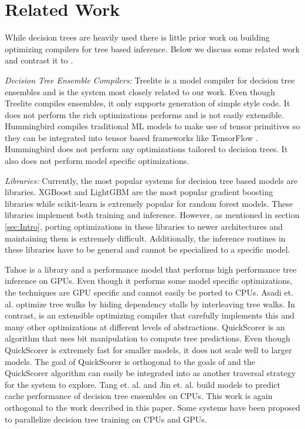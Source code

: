 \section{Related Work}
While decision trees are heavily used there is little prior work on building optimizing compilers for tree 
based inference. Below we discuss some related work and contrast it to \Treebeard{}.

\emph{Decision Tree Ensemble Compilers:}
Treelite\cite{Treelite} is a model compiler for decision tree ensembles and is the system
most closely related to our work. Even though Treelite compiles ensembles, it only supports 
generation of simple  style code. It does not perform the rich 
optimizations \Treebeard{} performs and is not easily extensible.
Hummingbird\cite{Hummingbird} compiles traditional ML models to make use 
of tensor primitives so 
they can be integrated into tensor based frameworks like TensorFlow \cite{TensorFlow}.
Hummingbird does not perform any optimizations tailored to decision trees. It 
also does not perform model specific optimizations. 

\emph{Libraries:} Currently, the most popular systems for decision tree based models 
are libraries. XGBoost\cite{XGBoost} and LightGBM\cite{LightGBM} are the most  
popular gradient boosting libraries while scikit-learn\cite{Sklearn} is 
extremely popular for random forest models. These libraries implement both 
training and inference. However, as mentioned in section \ref{sec:Intro}, porting 
optimizations in these libraries to newer architectures and maintaining them is 
extremely difficult. Additionally, the inference routines in these libraries have 
to be general and cannot be specialized to a specific model.

Tahoe\cite{Tahoe} is a library and a performance model that performs high 
performance tree inference on GPUs. Even though it performs some model 
specific optimizations, the techniques are GPU specific and cannot easily 
be ported to CPUs. Asadi et. al.\cite{VPred} optimize tree walks
by hiding dependency stalls by interleaving tree walks. In contrast, \Treebeard{} is an extensible 
optimizing compiler that carefully implements this and many other optimizations at different levels of abstractions.
QuickScorer\cite{QuickScorer, QuickScorer1} is an algorithm that uses 
bit manipulation to compute tree predictions. Even though QuickScorer is 
extremely fast for smaller models, it does not scale well to larger 
models\cite{ProbBasedLayout}. The goal of QuickScorer is orthogonal 
to the goals of \Treebeard{} and the QuickScorer algorithm can easily  
be integrated into \Treebeard{} as another traversal strategy for the 
system to explore. Tang et. al.\cite{CacheConscious1} and Jin et. al.\cite{CacheConscious2}
build models to predict cache performance of decision tree ensembles on CPUs.
This work is again orthogonal to the work described in this paper. Some systems have been proposed 
to parallelize decision tree training on CPUs and GPUs\cite{Jansson2014gpuRFAG, Nasridinov2013DecisionTC}.



